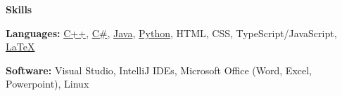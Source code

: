 \documentclass[10pt]{article}
\newlength{\headingborderwidth}
\newcommand{\resheading}[1]{
    \begin{mdframed}[
        backgroundcolor=black!15,
        linewidth=\headingborderwidth,
        innertopmargin=4pt,
        innerbottommargin=4pt,
        skipabove=6pt,
        skipbelow=2pt]
        \textbf{\large #1}
    \end{mdframed}
}
\newcommand{\ressubheading}[4]{
    \textbf{#1} \hfill #2 \\[0pt]
    \textit{#3} \hfill #4 \\[0pt]
}
\newenvironment{resitemize}{
    \vspace{-6pt}
    \begin{itemize}
    \setlength\itemsep{-2pt}
}{
    \end{itemize}
}
\begin{document}
\begin{NoHyper}
\begin{resitemize}
    \end{resitemize}


%
%

\resheading{Skills}

\textbf{Languages:}
    \href{https://en.wikipedia.org/wiki/C\%2B\%2B}{C++},
    \href{https://en.wikipedia.org/wiki/C_Sharp_(programming_language)}{C\#},
    \href{https://en.wikipedia.org/wiki/Java_(programming_language)}{Java},
    \href{https://www.python.org/}{Python},
    HTML, CSS, TypeScript/JavaScript,
    \href{https://www.latex-project.org/}{\LaTeX}

\textbf{Software:}
    Visual Studio,
    IntelliJ IDEs,
    Microsoft Office (Word, Excel, Powerpoint),
    Linux


\end{NoHyper}
\end{document}
